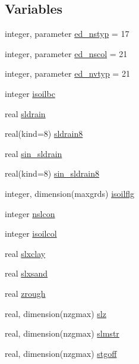 \subsection*{Variables}
\begin{DoxyCompactItemize}
\item 
integer, parameter \hyperlink{namespacesoil__coms_a354035bf03f4bb65c1636100aa6737e8}{ed\+\_\+nstyp} = 17
\item 
integer, parameter \hyperlink{namespacesoil__coms_a359b4988ce0556dd6f2138752c38d3dc}{ed\+\_\+nscol} = 21
\item 
integer, parameter \hyperlink{namespacesoil__coms_a8cb5da734a6673c4b75b841d0b4221aa}{ed\+\_\+nvtyp} = 21
\item 
integer \hyperlink{namespacesoil__coms_aaaf0d1eb40467ca926f9c31a296885bc}{isoilbc}
\item 
real \hyperlink{namespacesoil__coms_af1b6a6b86baeaad4354a141fdf9cfb04}{sldrain}
\item 
real(kind=8) \hyperlink{namespacesoil__coms_aa7685a29e0e9621f0cde33dfcca345cc}{sldrain8}
\item 
real \hyperlink{namespacesoil__coms_a7162076a5aaec83255f06fe55f799e31}{sin\+\_\+sldrain}
\item 
real(kind=8) \hyperlink{namespacesoil__coms_a29640d5396281a106cd29a5433cc4896}{sin\+\_\+sldrain8}
\item 
integer, dimension(maxgrds) \hyperlink{namespacesoil__coms_af246f6fbfc228e2eb7f079f811c1f3da}{isoilflg}
\item 
integer \hyperlink{namespacesoil__coms_a461eb2939beb7809ce27cce9b68cb38f}{nslcon}
\item 
integer \hyperlink{namespacesoil__coms_aa4458d218daa96cebe1a8c8a63cbf72f}{isoilcol}
\item 
real \hyperlink{namespacesoil__coms_a148f65826100f4c235d31e4dbc2c9b1e}{slxclay}
\item 
real \hyperlink{namespacesoil__coms_a4efc340287b7aa303bb409d4c537e55a}{slxsand}
\item 
real \hyperlink{namespacesoil__coms_ae83360d4f03ca2a56ab9de2732d47533}{zrough}
\item 
real, dimension(nzgmax) \hyperlink{namespacesoil__coms_aa22f925477a7c574761c66d5f157cc7d}{slz}
\item 
real, dimension(nzgmax) \hyperlink{namespacesoil__coms_a6a020a30c4f8a882edc28462a83e55ba}{slmstr}
\item 
real, dimension(nzgmax) \hyperlink{namespacesoil__coms_abe490ee71d5f063358005df47f9dee38}{stgoff}

\end{DoxyCompactItemize}
